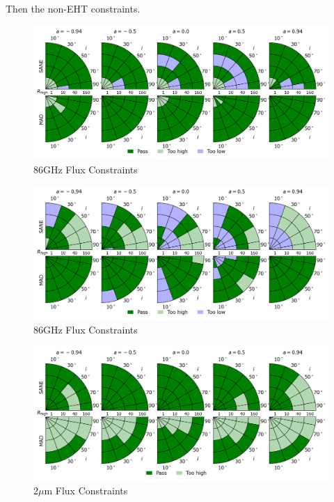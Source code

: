 Then the non-EHT constraints.

\begin{figure}
  \centering
  \includegraphics[width=\textwidth]{./figures/86GHz_flux_Constraints.png}
  \caption{86GHz Flux Constraints}
  \label{fig:86GHz_flux_pizza}
\end{figure}
\begin{figure}
  \centering
  \includegraphics[width=\textwidth]{./figures/86GHz_size_Constraints.png}
  \caption{86GHz Flux Constraints}
  \label{fig:86GHz_size_pizza}
\end{figure}
\begin{figure}
  \centering
  \includegraphics[width=\textwidth]{./figures/2um_flux_Constraints.png}
  \caption{2$\mu$m Flux Constraints}
  \label{fig:86GHz_size_pizza}
\end{figure}
